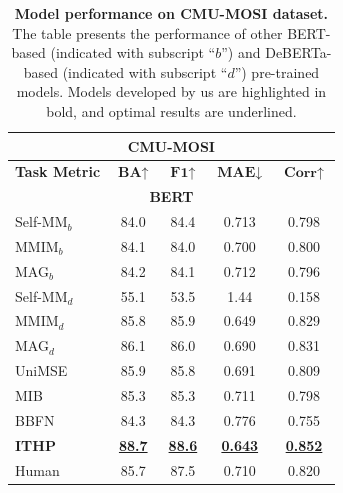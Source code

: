 \begin{table}
\vspace{-0.46 cm}
\setlength{\abovecaptionskip}{0.2 cm}
\setlength{\belowcaptionskip}{-0.506 cm} 
\centering
\setlength\tabcolsep{5.06 pt}
\begin{tabular}{lcccc}
\multicolumn{5}{c}{\textbf{CMU-MOSI}} \\
\hline\hline
\textbf{Task Metric} & $\textbf{BA}{\uparrow}$ & $\textbf{F1}{\uparrow}$ & $\textbf{MAE}{\downarrow}$ & $\textbf{Corr}{\uparrow}$ \\
\hline
\multicolumn{5}{c}{\textbf{BERT}} \\
\hline
Self-MM$_b$           & 84.0 & 84.4 & 0.713 & 0.798 \\
MMIM$_b$            & 84.1 & 84.0 & 0.700 & 0.800 \\
MAG$_b$   & 84.2 & 84.1 & 0.712 & 0.796 \\

Self-MM$_d$    & 55.1 & 53.5 & 1.44 & 0.158 \\
MMIM$_d$        & 85.8 & 85.9 & 0.649 & 0.829 \\
MAG$_d$    & 86.1 & 86.0 & 0.690 & 0.831 \\
UniMSE & 85.9 & 85.8 & 0.691 & 0.809 \\
MIB & 85.3 & 85.3 & 0.711 & 0.798 \\
BBFN & 84.3 & 84.3 & 0.776 & 0.755 \\
\textbf{ITHP} & \textbf{\uline{88.7}} & \textbf{\uline{88.6}} & \textbf{\uline{0.643}} & \textbf{\uline{0.852}} \\
\midrule 
Human       & 85.7 & 87.5 & 0.710 & 0.820 \\
\hline\hline
\end{tabular}
\caption{\textbf{Model performance on CMU-MOSI dataset.} The table presents the performance of other BERT-based (indicated with subscript ``$b$'') and DeBERTa-based (indicated with subscript ``$d$'') pre-trained models. Models developed by us are highlighted in bold, and optimal results are underlined.}%
\label{tab:ModelsPerformance_MOSI}
\end{table}
